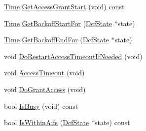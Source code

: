 \begin{DoxyCompactItemize}
\item 
\hyperlink{classns3_1_1Time}{Time} \hyperlink{classns3_1_1DcfManager_a6d98325e441871874382b63ee2674de3}{Get\+Access\+Grant\+Start} (void) const 
\item 
\hyperlink{classns3_1_1Time}{Time} \hyperlink{classns3_1_1DcfManager_a2c9e42c87d864900d9b1b0b76ea1c2ea}{Get\+Backoff\+Start\+For} (\hyperlink{classns3_1_1DcfState}{Dcf\+State} $\ast$state)
\item 
\hyperlink{classns3_1_1Time}{Time} \hyperlink{classns3_1_1DcfManager_a2a7e76982a4ebc1c2df5608efc111c33}{Get\+Backoff\+End\+For} (\hyperlink{classns3_1_1DcfState}{Dcf\+State} $\ast$state)
\item 
void \hyperlink{classns3_1_1DcfManager_a26764cee2de83e5293284ee40e447506}{Do\+Restart\+Access\+Timeout\+If\+Needed} (void)
\item 
void \hyperlink{classns3_1_1DcfManager_a7e45f4a0d0869e8d82cb0f6244627738}{Access\+Timeout} (void)
\item 
void \hyperlink{classns3_1_1DcfManager_ada5b0a54a00b77705d638b6ef457ba13}{Do\+Grant\+Access} (void)
\item 
bool \hyperlink{classns3_1_1DcfManager_a999e1243d1fb59c3d3a4b06e143782d8}{Is\+Busy} (void) const 
\item 
bool \hyperlink{classns3_1_1DcfManager_a77fe675d87a17ce5d6a858badb5e4c74}{Is\+Within\+Aifs} (\hyperlink{classns3_1_1DcfState}{Dcf\+State} $\ast$state) const 
\end{DoxyCompactItemize}
